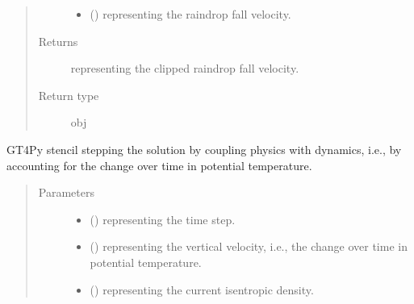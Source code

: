\documentclass[letterpaper,10pt,english]{sphinxmanual}
\begin{document}
\begin{fulllineitems}
\begin{fulllineitems}
\begin{quote}
\begin{description}
\begin{itemize}
\item {} 
 () \textendash{}  representing the raindrop fall velocity.

\end{itemize}

\item[{Returns}] \leavevmode
{} representing the clipped raindrop fall velocity.

\item[{Return type}] \leavevmode
obj

\end{description}\end{quote}

\end{fulllineitems}


\begin{fulllineitems}
\label{\detokenize{api:dycore.prognostic_isentropic_centered.PrognosticIsentropicCentered._stencil_stepping_by_coupling_physics_with_dynamics_defs}}
GT4Py stencil stepping the solution by coupling physics with dynamics, i.e., by accounting for the
change over time in potential temperature.
\begin{quote}\begin{description}
\item[{Parameters}] \leavevmode\begin{itemize}
\item {} 
 () \textendash{}  representing the time step.

\item {} 
 () \textendash{}  representing the vertical velocity, i.e., the change over time in
potential temperature.

\item {} 
 () \textendash{}  representing the current isentropic density.


\end{itemize}
\end{description}
\end{quote}
\end{fulllineitems}
\end{fulllineitems}
\end{document}
